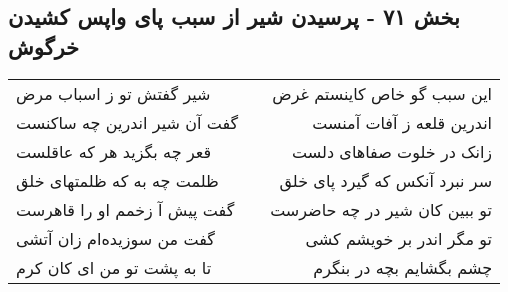\begin{center}
\section*{بخش ۷۱ - پرسیدن شیر از سبب پای واپس کشیدن خرگوش}
\label{sec:sh071}
\begin{longtable}{l p{0.5cm} r}
شیر گفتش تو ز اسباب مرض
&&
این سبب گو خاص کاینستم غرض
\\
گفت آن شیر اندرین چه ساکنست
&&
اندرین قلعه ز آفات آمنست
\\
قعر چه بگزید هر که عاقلست
&&
زانک در خلوت صفاهای دلست
\\
ظلمت چه به که ظلمتهای خلق
&&
سر نبرد آنکس که گیرد پای خلق
\\
گفت پیش آ زخمم او را قاهرست
&&
تو ببین کان شیر در چه حاضرست
\\
گفت من سوزیده‌ام زان آتشی
&&
تو مگر اندر بر خویشم کشی
\\
تا به پشت تو من ای کان کرم
&&
چشم بگشایم بچه در بنگرم
\\
\end{longtable}
\end{center}
